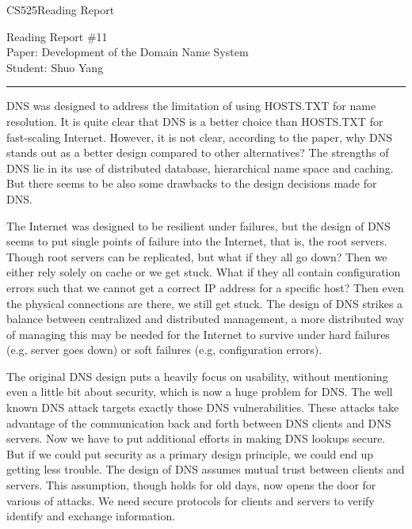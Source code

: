 \documentclass[11pt]{article}
\def\CourseCode{CS525}
\def\ReportNo{11}
\def\Category{Reading Report}
\def\PaperTitle{Development of the Domain Name System}
\def\Author{Shuo Yang}
\begin{document}
\noindent

\CourseCode \hfill \Category

\begin{center}
Reading Report \#\ReportNo\\
Paper: \PaperTitle\\
Student: \Author\\
\end{center}

\hrule\smallskip
\vspace{1.5em}

DNS was designed to address the limitation of using HOSTS.TXT for
name resolution. It is quite clear that DNS
is a better choice than HOSTS.TXT for fast-scaling Internet. However,
it is not clear, according to the paper, why DNS stands out as a better
design compared to other alternatives? The strengths of DNS lie in its
use of distributed database,
hierarchical name space and caching. But there seems to be also some
drawbacks to the design decisions made for DNS.

\vspace{1em}
The Internet was designed to be resilient under failures, but the
design of DNS seems to put single points of failure into the Internet,
that is, the root servers. Though root servers can be replicated, but
what if they all go down? Then we either rely solely on cache or we
get stuck. What if they all contain configuration errors such that we
cannot get a correct IP address for a specific host? Then even the
physical connections are there, we still get stuck. The design of DNS
strikes a balance between centralized and distributed management, a 
more distributed way of managing this may be needed for the Internet
to survive under hard failures (e.g, server goes down) or soft failures
(e.g, configuration errors).

\vspace{1em}
The original DNS design puts a heavily focus on usability, without
mentioning even a little bit about security, which is now a huge
problem for DNS. The well known DNS attack targets exactly those DNS
vulnerabilities. These attacks take advantage of the communication
back and forth between DNS clients and DNS servers. Now we have to put
additional efforts in making DNS lookups secure. But if we could put
security as a primary design principle, we could end up getting less
trouble. The design of DNS assumes mutual trust between clients and
servers. This assumption, though holds for old days, now opens the
door for various of attacks. We need secure protocols for
clients and servers to verify identify and exchange information.
\end{document}
